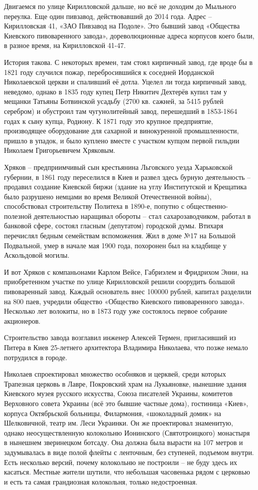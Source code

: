 Двигаемся по улице Кирилловской дальше, но всё не доходим до Мыльного переулка. Еще один пивзавод, действовавший до 2014 года. Адрес – Кирилловская 41, «ЗАО Пивзавод на Подоле». Это бывший завод «Общества Киевского пивоваренного завода», дореволюционные адреса корпусов коего были, в разное время, на Кирилловской 41-47.

История такова. С некоторых времен, там стоял кирпичный завод, где вроде бы в 1821 году случился пожар, перебросившийся к соседней Иорданской Николаевской церкви и спаливший её дотла. Уцелел ли тогда кирпичный завод, неведомо, однако в 1835 году купец Петр Никитич Дехтерёв купил там у мещанки Татьяны Ботвинской усадьбу (2700 кв. сажней, за 5415 рублей серебром) и обустроил там чугунолитейный завод, перешедший в 1853-1864 годах к сыну купца, Родиону. К 1871 году это крупное предприятие, производящее оборудование для сахарной и винокуренной промышленности, пришло в упадок, и было куплено вместе с участком купцом первой гильдии Николаем Григорьевичем Хряковым.

Хряков – предприимчивый сын крестьянина Льговского уезда Харьковской губернии, в 1861 году переселился в Киев и развел здесь бурную деятельность – продавил создание Киевской биржи (здание на углу Институтской и Крещатика было разрушено немцами во время Великой Отечественной войны), способствовал строительству Политеха в 1890-е, попутно с общественно-полезной деятельностью наращивал обороты – стал сахарозаводчиком, работал в банковой сфере, состоял гласным (депутатом) городской думы. Втихаря перечислял бедным семействам вспоможения. Жил в доме №17 на Большой Подвальной, умер в начале мая 1900 года, похоронен был на кладбище у Аскольдовой могилы.

И вот Хряков с компаньонами Карлом Вейсе, Габриэлем и Фридрихом Энни, на приобретенном участке по улице Кирилловской решили соорудить большой пивоваренный завод. Каждый основатель внес 100000 рублей, капитал разделили на 800 паев, учредили общество «Общество Киевского пивоваренного завода». Несколько лет волокиты, но в 1873 году уже состоялось первое собрание акционеров.

Строительство завода возглавил инженер Алексей Термен, пригласивший из Питера в Киев 25-летнего архитектора Владимира Николаева, что позже немало потрудился в городе. 

Николаев спроектировал множество особняков и церквей, среди которых Трапезная церковь в Лавре, Покровский храм на Лукьяновке, нынешние здания Киевского музея русского искусства, Союза писателей Украины, комитетов Верховного совета Украины (всё это бывшие частные дома), гостиница «Киев», корпуса Октябрьской больницы, Филармония, «шоколадный домик» на Шелковичной, театр им. Леси Украинки. Он же проектировал знаменитую, однако неосуществленную колокольню Ионинского (Святотроицкого) монастыря в нынешнем зверинецком ботсаду. Она должна была вырасти на 107 метров и задумывалась в виде полой флейты с ленточным, без ступеней, подъемом внутри. Есть несколько версий, почему колокольню не построили – не буду здесь их касаться. Местные жители шутили, что небольшая часовенька рядом с церковью и есть та самая грандиозная колокольня, только недостроенная.

